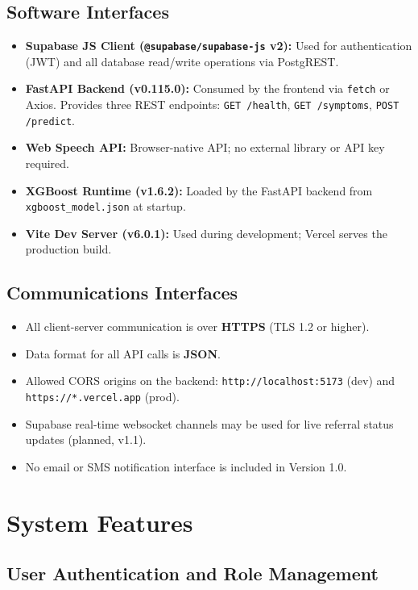 \documentclass[12pt,a4paper]{article}
\begin{document}
\subsection{Software Interfaces}
\begin{itemize}
    \item \textbf{Supabase JS Client (\texttt{@supabase/supabase-js} v2):} Used for authentication (JWT) and all database read/write operations via PostgREST.
    \item \textbf{FastAPI Backend (v0.115.0):} Consumed by the frontend via \texttt{fetch} or Axios. Provides three REST endpoints: \texttt{GET /health}, \texttt{GET /symptoms}, \texttt{POST /predict}.
    \item \textbf{Web Speech API:} Browser-native API; no external library or API key required.
    \item \textbf{XGBoost Runtime (v1.6.2):} Loaded by the FastAPI backend from \texttt{xgboost\_model.json} at startup.
    \item \textbf{Vite Dev Server (v6.0.1):} Used during development; Vercel serves the production build.
\end{itemize}

\subsection{Communications Interfaces}
\begin{itemize}
    \item All client-server communication is over \textbf{HTTPS} (TLS 1.2 or higher).
    \item Data format for all API calls is \textbf{JSON}.
    \item Allowed CORS origins on the backend: \texttt{http://localhost:5173} (dev) and \texttt{https://*.vercel.app} (prod).
    \item Supabase real-time websocket channels may be used for live referral status updates (planned, v1.1).
    \item No email or SMS notification interface is included in Version 1.0.
\end{itemize}

\section{System Features}

\subsection{User Authentication and Role Management}
\end{document}
